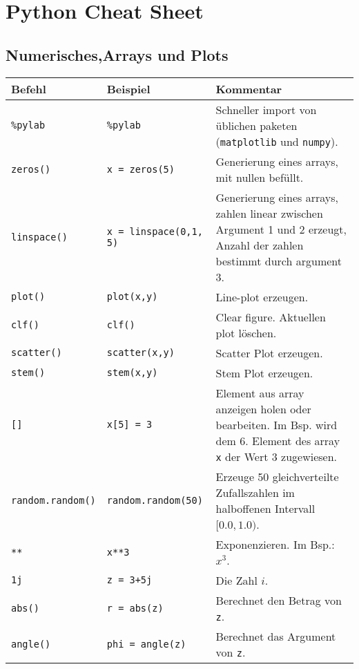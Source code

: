

\section*{Python Cheat Sheet}\label{sec:pythonCheat}
\subsection*{Numerisches,Arrays und Plots}
\begin{table}[H]
    \centering
    \begin{tabular}{|l|l|p{7cm}|}
        \hline
    \textbf{Befehl} & \textbf{Beispiel} & \textbf{Kommentar} \\ \hline
    
    \texttt{\%pylab} & \texttt{\%pylab} & Schneller import von üblichen paketen (\texttt{matplotlib} und \texttt{numpy}). \\ \hline
    \texttt{zeros()} & \texttt{x = zeros(5)} & Generierung eines arrays, mit nullen befüllt. \\ \hline
    \texttt{linspace()} & \texttt{x = linspace(0,1, 5)} & Generierung eines arrays, zahlen linear zwischen Argument 1 und 2 erzeugt, Anzahl der zahlen bestimmt durch argument 3. \\ \hline
    \texttt{plot()} & \texttt{plot(x,y)} & Line-plot erzeugen.  \\ \hline
    \texttt{clf()} & \texttt{clf()} & Clear figure. Aktuellen plot löschen.  \\ \hline
    \texttt{scatter()} & \texttt{scatter(x,y)} & Scatter Plot erzeugen. \\ \hline
    \texttt{stem()} & \texttt{stem(x,y)} & Stem Plot erzeugen. \\ \hline

    \texttt{[]} & \texttt{x[5] = 3} & Element aus array anzeigen holen oder bearbeiten. Im Bsp. wird dem 6. Element des array \texttt{x} der Wert 3 zugewiesen. \\ \hline
    \texttt{random.random()} & \texttt{random.random(50)} & Erzeuge 50 gleichverteilte Zufallszahlen im halboffenen Intervall $[0.0, 1.0)$. \\ \hline
    \texttt{**} & \texttt{x**3} & Exponenzieren. Im Bsp.: $x^3$. \\ \hline
    \texttt{1j} & \texttt{z = 3+5j} & Die Zahl $i$. \\ \hline
    \texttt{abs()} & \texttt{r = abs(z)} & Berechnet den Betrag von \texttt{z}. \\ \hline
    \texttt{angle()} & \texttt{phi = angle(z)} & Berechnet das Argument von \texttt{z}. \\ \hline

    \end{tabular}
\end{table}

